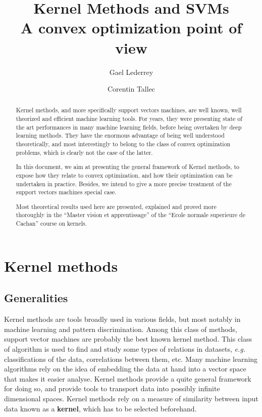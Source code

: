 \documentclass[a4paper, 11pt]{article}
\title{{\bf Kernel Methods and SVMs} \\
{\large A convex optimization point of view}}
\author{Gael Lederrey\\
  \and
Corentin Tallec}
\begin{document}
\maketitle
\begin{abstract}
  Kernel methods, and more specifically support vectors machines, are
  well known, well theorized and efficient machine learning tools. For
  years, they were presenting state of the art performances in many
  machine learning fields, before being overtaken by deep learning
  methods. They have the enormous advantage of being well understood
  theoretically, and most interestingly to belong to the class of
  convex optimization problems, which is clearly not the case of the
  latter.

  In this document, we aim at presenting the general framework of
  Kernel methods, to expose how they relate to convex optimization,
  and how their optimization can be undertaken in practice. Besides,
  we intend to give a more precise treatment of the support vectors
  machines special case.

  Most theoretical results used here are presented, explained and
  proved more thoroughly in the ``Master vision et apprentissage''
  of the ``Ecole normale superieure de Cachan'' course on kernels.
\end{abstract}

\section{Kernel methods}
\subsection{Generalities}
\label{sub:gen}

Kernel methods are tools broadly used in various fields, but most notably in
machine learning and pattern discrimination. Among this class of methods,
support vector machines are probably the best known kernel method. This class
of algorithm is used to find and study some types of relations in datasets,
{\it e.g.} classifications of the data, correlations between them, etc. Many
machine learning algorithms rely on the idea of embedding the data at hand
into a vector space that makes it easier analyse. Kernel methods provide
a quite general framework for doing so, and provide tools to transport data
into possibly infinite dimensional spaces. Kernel methods rely on a measure
of similarity between input data known as a {\bf kernel}, which has to be selected
beforehand.
\end{document}
